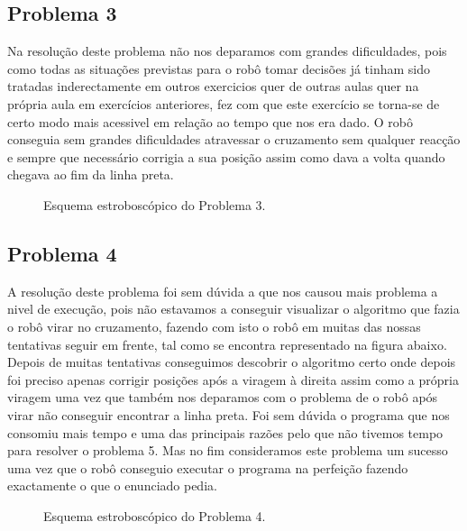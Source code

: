 \documentclass[a4paper, 12pt, onecolumn, oneside]{report}
\begin{document}
\newpage
\subsection{Problema 3}


Na resolução deste problema não nos deparamos com grandes dificuldades, pois como todas as situações previstas para o robô tomar decisões já tinham sido tratadas inderectamente em outros exercicios quer de outras aulas quer na própria aula em exercícios anteriores, fez com que este exercício se torna-se de certo modo mais acessivel em relação ao tempo que nos era dado. O robô conseguia sem grandes dificuldades atravessar o cruzamento sem qualquer reacção e sempre que necessário corrigia a sua posição assim como dava a volta quando chegava ao fim da linha preta.



\begin{figure}[H]
\caption{Esquema estroboscópico do Problema 3.}
\label{fig:speciation}
\end{figure}

\newpage
\subsection{Problema 4}

A resolução deste problema foi sem dúvida a que nos causou mais problema a nivel de execução, pois não estavamos a conseguir visualizar o algoritmo que fazia o robô virar no cruzamento, fazendo com isto o robô em muitas das nossas tentativas seguir em frente, tal como se encontra representado na figura abaixo. Depois de muitas tentativas conseguimos descobrir o algoritmo certo onde depois foi preciso apenas corrigir posições após a viragem à direita assim como a própria viragem uma vez que também nos deparamos com o problema de o robô após virar não conseguir encontrar a linha preta. Foi sem dúvida o programa que nos consomiu mais tempo e uma das principais razões pelo que não tivemos tempo para resolver o problema 5. Mas no fim consideramos este problema um sucesso uma vez que o robô conseguio executar o programa na perfeição fazendo exactamente o que o enunciado pedia.


\begin{figure}[H]
\caption{Esquema estroboscópico do Problema 4.}
\label{fig:speciation}
\end{figure}

\newpage
\end{document}
